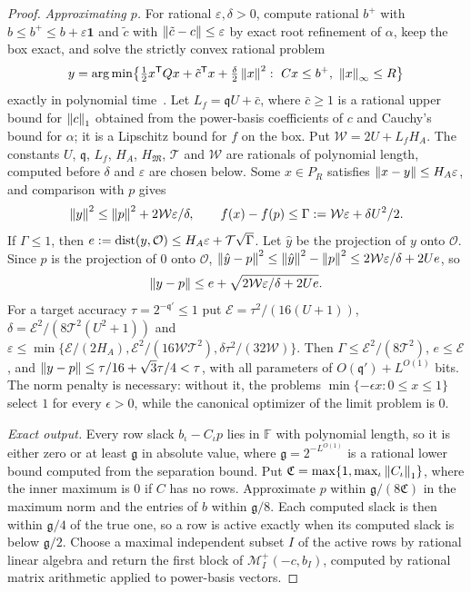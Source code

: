 \begin{proof}
\emph{Approximating $p$.} For rational $\varepsilon,\delta>0$, compute
rational $b^+$ with $b\le b^+\le b+\varepsilon\mathbf1$ and $\tilde c$ with
$\left\lVert\tilde c-c\right\rVert\le\varepsilon$ by exact root refinement of $\alpha$, keep
the box exact, and solve the strictly convex rational problem
\[
y=\operatorname*{arg\,min}\bigl\{\tfrac12x^{\mathsf T}Qx+\tilde c^{\mathsf T}x+
\tfrac\delta2\left\lVert x\right\rVert^2:\ Cx\le b^+,\ \left\lVert x\right\rVert_\infty\le R\bigr\}
\]
exactly in polynomial time~\cite{KozlovTarasovKhachiyan1980}. Let
$L_f=\mathfrak qU+\bar c$, where $\bar c\ge1$ is a rational upper bound for
$\left\lVert c\right\rVert_1$ obtained from the power-basis coefficients of $c$ and Cauchy's
bound for $\alpha$; it is a Lipschitz bound for $f$ on the box. Put
$\mathcal W=2U+L_fH_A$. The constants $U$, $\mathfrak q$, $L_f$, $H_A$,
$H_{\mathfrak M}$, $\mathcal T$ and $\mathcal W$ are rationals of polynomial
length, computed before $\delta$ and $\varepsilon$ are chosen below. Some
$x\in P_R$ satisfies $\left\lVert x-y\right\rVert\le H_A\varepsilon$, and comparison with $p$
gives
\[
\left\lVert y\right\rVert^2\le\left\lVert p\right\rVert^2+2\mathcal W\varepsilon/\delta,\qquad
f(x)-f(p)\le\Gamma:=\mathcal W\varepsilon+\delta U^2/2 .
\]
If $\Gamma\le1$, then $e:=\operatorname{dist}(y,\mathcal O)\le H_A\varepsilon+\mathcal T
\sqrt\Gamma$. Let $\hat y$ be the projection of $y$ onto $\mathcal O$. Since
$p$ is the projection of $0$ onto $\mathcal O$,
$\left\lVert\hat y-p\right\rVert^2\le\left\lVert\hat y\right\rVert^2-\left\lVert p\right\rVert^2\le2\mathcal W\varepsilon/\delta
+2Ue$, so
\[
\left\lVert y-p\right\rVert\le e+\sqrt{2\mathcal W\varepsilon/\delta+2Ue} .
\]
For a target accuracy $\tau=2^{-\mathfrak q'}\le1$ put
$\mathcal E=\tau^2/(16(U+1))$, $\delta=\mathcal E^2/(8\mathcal T^2(U^2+1))$ and
$\varepsilon\le\min\{\mathcal E/(2H_A),\mathcal E^2/(16\mathcal W\mathcal T^2),
\delta\tau^2/(32\mathcal W)\}$. Then $\Gamma\le\mathcal E^2/(8\mathcal T^2)$,
$e\le\mathcal E$, and $\left\lVert y-p\right\rVert\le\tau/16+\sqrt3\tau/4<\tau$, with all
parameters of $O(\mathfrak q')+L^{O(1)}$ bits. The norm penalty is necessary:
without it, the problems $\min\{-\epsilon x:0\le x\le1\}$ select $1$ for
every $\epsilon>0$, while the canonical optimizer of the limit problem is $0$.

\emph{Exact output.} Every row slack $b_\iota-C_\iota p$ lies in $\mathbb F$
with polynomial length, so it is either zero or at least $\mathfrak g$ in
absolute value, where $\mathfrak g=2^{-L^{O(1)}}$ is a rational lower bound
computed from the separation bound. Put
$\mathfrak C=\max\{1,\max_\iota\left\lVert C_\iota\right\rVert_1\}$, where the inner maximum is
$0$ if $C$ has no rows. Approximate $p$ within $\mathfrak g/(8\mathfrak C)$ in
the maximum norm and the entries of $b$ within $\mathfrak g/8$. Each computed
slack is then within $\mathfrak g/4$ of the true one, so a row is active
exactly when its computed slack is below $\mathfrak g/2$. Choose a maximal
independent subset $I$ of the active rows by rational linear algebra and
return the first block of $\mathcal M_I^+(-c,b_I)$, computed by rational
matrix arithmetic applied to power-basis vectors.


\end{proof}
